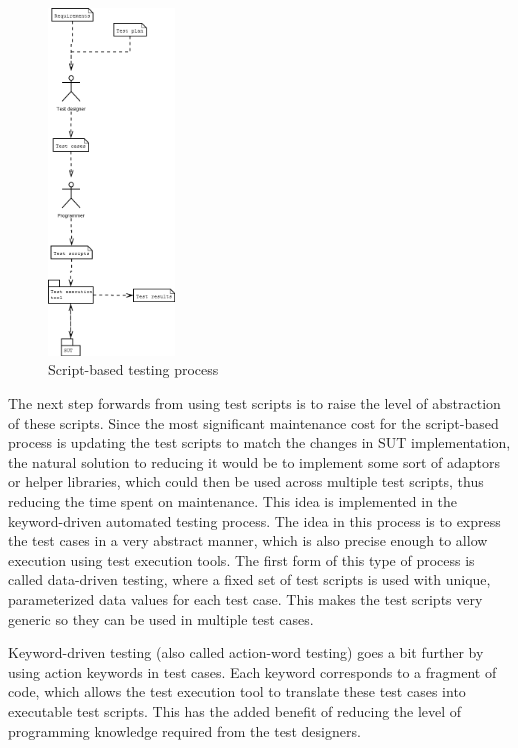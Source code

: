 \begin{figure}[ht]
	\begin{center}
		\includegraphics*[width=0.3\textwidth]{kuvat/TS_process}
	\end{center}
	\caption{Script-based testing process}
	\label{fig:tsprocess}
\end{figure}

The next step forwards from using test scripts is to raise the level of abstraction of these scripts. Since the most significant maintenance cost for the script-based process is updating the test scripts to match the changes in SUT implementation, the natural solution to reducing it would be to implement some sort of adaptors or helper libraries, which could then be used across multiple test scripts, thus reducing the time spent on maintenance. This idea is implemented in the keyword-driven automated testing process. The idea in this process is to express the test cases in a very abstract manner, which is also precise enough to allow execution using test execution tools. The first form of this type of process is called data-driven testing, where a fixed set of test scripts is used with unique, parameterized data values for each test case. This makes the test scripts very generic so they can be used in multiple test cases.

Keyword-driven testing (also called action-word testing) goes a bit further by using action keywords in test cases. Each keyword corresponds to a fragment of code, which allows the test execution tool to translate these test cases into executable test scripts. This has the added benefit of reducing the level of programming knowledge required from the test designers.

